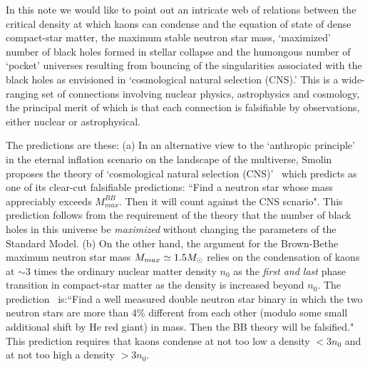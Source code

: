 \documentclass[aps,twocolumn,preprintnumbers,%
superscriptaddress,floatfix]{revtex4}
\begin{document}
In this note we would like to point out an intricate web of relations between the critical density at which kaons can condense and the equation of state of dense compact-star matter, the maximum stable neutron star mass, `maximized' number of black holes formed in stellar collapse and  the humongous number of `pocket' universes resulting from bouncing of the singularities associated with the black holes as envisioned in `cosmological natural selection (CNS).' This is a wide-ranging set of connections involving nuclear physics, astrophysics and cosmology, the principal merit of which is that each connection is falsifiable by observations, either nuclear or astrophysical.

The predictions are these:
(a) In an alternative view to the `anthropic principle' in the  eternal inflation scenario on the landscape of the multiverse, Smolin proposes the theory of `cosmological natural selection (CNS)'~\cite{Smo97} which predicts as one of its clear-cut falsifiable predictions: ``Find a neutron star whose mass appreciably exceeds $M^{BB}_{max}$. Then it will count against the CNS scnario"\cite{Smo97,Smo04}. This prediction  follows from the requirement of the theory that the number of black holes in this universe be {\em maximized} without changing the parameters of the Standard Model.
%
(b) On the other hand, the argument for the Brown-Bethe maximum neutron star mass $M_{max}\simeq 1.5\mbox{$M_\odot$}$  relies on  the condensation of kaons at $\sim 3$ times the ordinary nuclear matter density $n_0$ as the {\em  first and last} phase transition in compact-star matter as the density is increased beyond $n_0$. The prediction~\cite{BLR-kaon07} is:``Find a well measured double neutron star binary in which the two neutron stars are more than 4\% different from each other (modulo some small additional shift by He red giant) in mass. Then the BB theory will be falsified." This prediction  requires that kaons condense at not too low a density $< 3n_0$ and at not too high a density $>3 n_0$.
%
\end{document}
